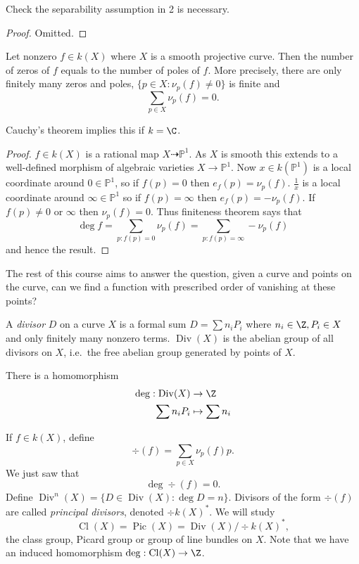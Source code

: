 \documentclass[a4paper]{article}
\DeclareMathOperator{\Cl}{Cl}
\renewcommand*{\P}{\mathbb{P}}
\newcommand{\rational}{\dashrightarrow} %
\DeclareMathOperator{\Div}{Div} %
\begin{document}
\begin{ex}
  Check the separability assumption in 2 is necessary.
\end{ex}

\begin{proof}
  Omitted.
\end{proof}

\begin{corollary}
  Let nonzero \(f \in k(X)\) where \(X\) is a smooth projective curve. Then the number of zeros of \(f\) equals to the number of poles of \(f\). More precisely, there are only finitely many zeros and poles, \(\{p \in X: \nu_p(f) \neq 0\}\) is finite and
  \[
    \sum_{p \in X} \nu_p(f) = 0.
  \]
\end{corollary}
Cauchy's theorem implies this if \(k = \C\).

\begin{proof}
  \(f \in k(X)\) is a rational map \(X \rational \P^1\). As \(X\) is smooth this extends to a well-defined morphism of algebraic varieties \(X \to \P^1\). Now \(x \in k(\P^1)\) is a local coordinate around \(0 \in \P^1\), so if \(f(p) = 0\) then \(e_f(p) = \nu_p(f)\). \(\frac{1}{x}\) is a local coordinate around \(\infty \in \P^1\) so if \(f(p) = \infty\) then \(e_f(p) = - \nu_p(f)\). If \(f(p) \neq 0\) or \(\infty\) then \(\nu_p(f) = 0\). Thus finiteness theorem says that
  \[
    \deg f = \sum_{p: f(p) = 0} \nu_p(f) = \sum_{p: f(p) = \infty} - \nu_p(f)
  \]
  and hence the result.
\end{proof}

The rest of this course aims to answer the question, given a curve and points on the curve, can we find a function with prescribed order of vanishing at these points?

\begin{definition}[divisor]
  A \emph{divisor} \(D\) on a curve \(X\) is a formal sum \(D = \sum n_i P_i\) where \(n_i \in \Z, P_i \in X\) and only finitely many nonzero terms. \(\Div (X)\) is the abelian group of all divisors on \(X\), i.e.\ the free abelian group generated by points of \(X\).
\end{definition}

There is a homomorphism
\begin{align*}
  \deg: \Div(X) &\to \Z \\
  \sum n_i P_i &\mapsto \sum n_i
\end{align*}

If \(f \in k(X)\), define
\[
  \div(f) =  \sum_{p \in X} \nu_p(f) p.
\]
We just saw that
\[
  \deg \div (f) = 0.
\]
Define \(\Div^n(X) = \{D \in \Div(X): \deg D = n\}\). Divisors of the form \(\div (f)\) are called \emph{principal divisors}, denoted \(\div k(X)^*\). We will study
\[
  \Cl (X) = \operatorname{Pic} (X) = \Div(X) / \div k(X)^*,
\]
the class group, Picard group or group of line bundles on \(X\). Note that we have an induced homomorphism \(\deg: \Cl (X) \to \Z\).
\end{document}
